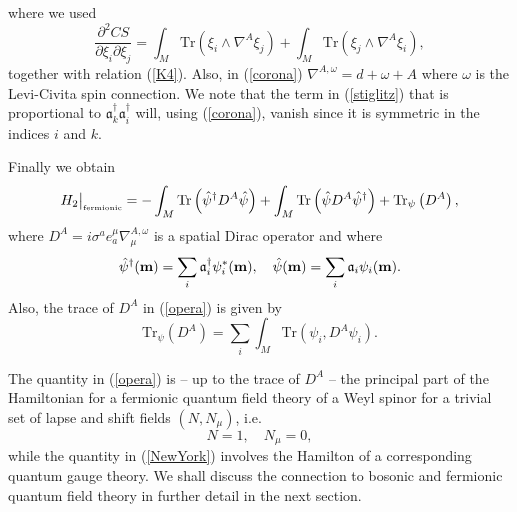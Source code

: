 \documentclass[letterpaper,11pt]{article}
\def\m{\mu}
\def\n{\nu}
\def\oo{\omega}
\newcommand{\pa}{\partial}
\begin{document}
where we used 
$$
 \frac{\pa^2 CS}{\pa \xi_{i } \pa \xi_{j }} 
 =    \int_M \mbox{Tr} \left(  \xi_{i  }  \wedge \nabla^A  \xi_{j} \right) + \int_M \mbox{Tr} \left(  \xi_{j  }  \wedge \nabla^A  \xi_{i} \right)   ,   
$$
together with relation (\ref{K4}). Also, in (\ref{corona}) $\nabla^{A,\oo}= d+\oo + A$ where $\oo$ is the Levi-Civita spin connection. %
We note that the term in (\ref{stiglitz}) that is proportional to $ \mathfrak{a}^\dagger_k \mathfrak{a}^\dagger_i $ will, using (\ref{corona}), vanish since it is symmetric in the indices $i$ and $k$. 





Finally we obtain  
\begin{equation}
H_2\big\vert_{\mbox{\tiny fermionic}} =   -\int_M  \mbox{Tr} \left(  \hat{\psi}^\dagger D^A \hat{\psi}\right)  + \int_M  \mbox{Tr} \left(  \hat{\psi}   D^A \hat{\psi}^\dagger\right) +  \mbox{Tr}_\psi\left( D^A  \right) ,
\label{opera}
\end{equation}
where $D^A= i \sigma^a e_a^\m \nabla_\m^{A,\oo}$ is a spatial Dirac operator and where
\begin{equation}
\hat{\psi}^\dagger  ({\bf m})  = \sum_i \mathfrak{a}_i^\dagger {\psi}^*_i  ({\bf m})  , \quad \hat{\psi} ({\bf m}) = \sum_i \mathfrak{a}_i \psi_i  ({\bf m}) .
\label{faber}
\end{equation}
Also, the trace of $D^A$ in (\ref{opera}) is given by
\begin{equation}
\mbox{Tr}_\psi \left( D^A  \right) = \sum_i \int_M  \mbox{Tr} \left(  {\psi}_i ,  D^A {\psi}_i\right) .
\label{bbbb}
\end{equation}

 The quantity in (\ref{opera}) is -- up to the trace of $D^A$ -- the principal part of the Hamiltonian for a fermionic quantum field theory of a Weyl spinor \cite{Paschke} for a trivial set of lapse and shift fields $(N,N_\m)$, i.e. $$N=1,\quad N_\m=0,$$ while the quantity in (\ref{NewYork}) involves the Hamilton of a corresponding quantum gauge theory. We shall discuss the connection to bosonic and fermionic quantum field theory in further detail in the next section. 
\end{document}
